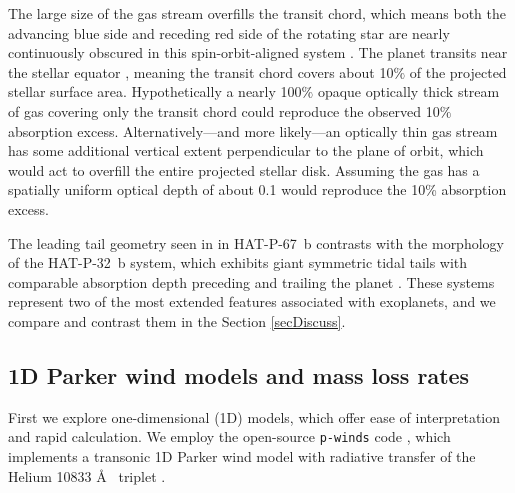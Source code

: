 \documentclass[twocolumn]{aastex631}
\begin{document}
The large size of the gas stream overfills the transit chord, which means both the advancing blue side and receding red side of the rotating star are nearly continuously obscured in this spin-orbit-aligned system \citep{2017AJ....153..211Z}. The planet transits near the stellar equator \citep{2017AJ....153..211Z}, meaning the transit chord covers about 10$\%$ of the projected stellar surface area.  Hypothetically a nearly 100$\%$ opaque optically thick stream of gas covering only the transit chord could reproduce the observed 10$\%$ absorption excess.  Alternatively---and more likely---an optically thin gas stream has some additional vertical extent perpendicular to the plane of orbit, which would act to overfill the entire projected stellar disk.  Assuming the gas has a spatially uniform optical depth of about 0.1 would reproduce the 10\% absorption excess.

The leading tail geometry seen in in HAT-P-67~b contrasts with the morphology of the HAT-P-32~b system, which exhibits giant symmetric tidal tails with comparable absorption depth preceding and trailing the planet \citep{doi:10.1126/sciadv.adf8736}.  These systems represent two of the most extended features associated with exoplanets, and we compare and contrast them in the Section \ref{secDiscuss}.


\subsection{1D Parker wind models and mass loss rates}\label{pwinds}
First we explore one-dimensional (1D) models, which offer ease of interpretation and rapid calculation.  We employ the open-source \texttt{p-winds} code \citep{2022A&A...659A..62D}, which implements a transonic 1D Parker wind model with radiative transfer of the Helium 10833 \AA~ triplet \citep{2018ApJ...855L..11O,2020A&A...636A..13L}.
\end{document}
